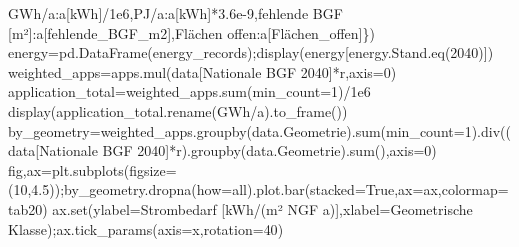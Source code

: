 \documentclass[
  ngerman,
  a4paper,
  DIV=11]{scrreprt}
\newenvironment{Shaded}{\begin{snugshade}}{\end{snugshade}}
\newcommand{\BuiltInTok}[1]{\textcolor[rgb]{0.00,0.23,0.31}{#1}}
\newcommand{\DecValTok}[1]{\textcolor[rgb]{0.68,0.00,0.00}{#1}}
\newcommand{\FloatTok}[1]{\textcolor[rgb]{0.68,0.00,0.00}{#1}}
\newcommand{\NormalTok}[1]{\textcolor[rgb]{0.00,0.23,0.31}{#1}}
\newcommand{\OperatorTok}[1]{\textcolor[rgb]{0.37,0.37,0.37}{#1}}
\newcommand{\StringTok}[1]{\textcolor[rgb]{0.13,0.47,0.30}{#1}}
\newcommand{\VariableTok}[1]{\textcolor[rgb]{0.07,0.07,0.07}{#1}}
\begin{document}
\begin{Shaded}
\begin{Highlighting}[]
            \StringTok{\textquotesingle{}GWh/a\textquotesingle{}}\NormalTok{:a[}\StringTok{\textquotesingle{}kWh\textquotesingle{}}\NormalTok{]}\OperatorTok{/}\FloatTok{1e6}\NormalTok{,}\StringTok{\textquotesingle{}PJ/a\textquotesingle{}}\NormalTok{:a[}\StringTok{\textquotesingle{}kWh\textquotesingle{}}\NormalTok{]}\OperatorTok{*}\FloatTok{3.6e{-}9}\NormalTok{,}\StringTok{\textquotesingle{}fehlende BGF [m²]\textquotesingle{}}\NormalTok{:a[}\StringTok{\textquotesingle{}fehlende\_BGF\_m2\textquotesingle{}}\NormalTok{],}\StringTok{\textquotesingle{}Flächen offen\textquotesingle{}}\NormalTok{:a[}\StringTok{\textquotesingle{}Flächen\_offen\textquotesingle{}}\NormalTok{]\})}
\NormalTok{energy}\OperatorTok{=}\NormalTok{pd.DataFrame(energy\_records)}\OperatorTok{;}\NormalTok{display(energy[energy.Stand.eq(}\StringTok{\textquotesingle{}2040\textquotesingle{}}\NormalTok{)])}
\NormalTok{weighted\_apps}\OperatorTok{=}\NormalTok{apps.mul(data[}\StringTok{\textquotesingle{}Nationale BGF 2040\textquotesingle{}}\NormalTok{]}\OperatorTok{*}\NormalTok{r,axis}\OperatorTok{=}\DecValTok{0}\NormalTok{)}
\NormalTok{application\_total}\OperatorTok{=}\NormalTok{weighted\_apps.}\BuiltInTok{sum}\NormalTok{(min\_count}\OperatorTok{=}\DecValTok{1}\NormalTok{)}\OperatorTok{/}\FloatTok{1e6}
\NormalTok{display(application\_total.rename(}\StringTok{\textquotesingle{}GWh/a\textquotesingle{}}\NormalTok{).to\_frame())}
\NormalTok{by\_geometry}\OperatorTok{=}\NormalTok{weighted\_apps.groupby(data.Geometrie).}\BuiltInTok{sum}\NormalTok{(min\_count}\OperatorTok{=}\DecValTok{1}\NormalTok{).div((data[}\StringTok{\textquotesingle{}Nationale BGF 2040\textquotesingle{}}\NormalTok{]}\OperatorTok{*}\NormalTok{r).groupby(data.Geometrie).}\BuiltInTok{sum}\NormalTok{(),axis}\OperatorTok{=}\DecValTok{0}\NormalTok{)}
\NormalTok{fig,ax}\OperatorTok{=}\NormalTok{plt.subplots(figsize}\OperatorTok{=}\NormalTok{(}\DecValTok{10}\NormalTok{,}\FloatTok{4.5}\NormalTok{))}\OperatorTok{;}\NormalTok{by\_geometry.dropna(how}\OperatorTok{=}\StringTok{\textquotesingle{}all\textquotesingle{}}\NormalTok{).plot.bar(stacked}\OperatorTok{=}\VariableTok{True}\NormalTok{,ax}\OperatorTok{=}\NormalTok{ax,colormap}\OperatorTok{=}\StringTok{\textquotesingle{}tab20\textquotesingle{}}\NormalTok{)}
\NormalTok{ax.}\BuiltInTok{set}\NormalTok{(ylabel}\OperatorTok{=}\StringTok{\textquotesingle{}Strombedarf [kWh/(m² NGF a)]\textquotesingle{}}\NormalTok{,xlabel}\OperatorTok{=}\StringTok{\textquotesingle{}Geometrische Klasse\textquotesingle{}}\NormalTok{)}\OperatorTok{;}\NormalTok{ax.tick\_params(axis}\OperatorTok{=}\StringTok{\textquotesingle{}x\textquotesingle{}}\NormalTok{,rotation}\OperatorTok{=}\DecValTok{40}\NormalTok{)}

\end{Highlighting}
\end{Shaded}
\end{document}
